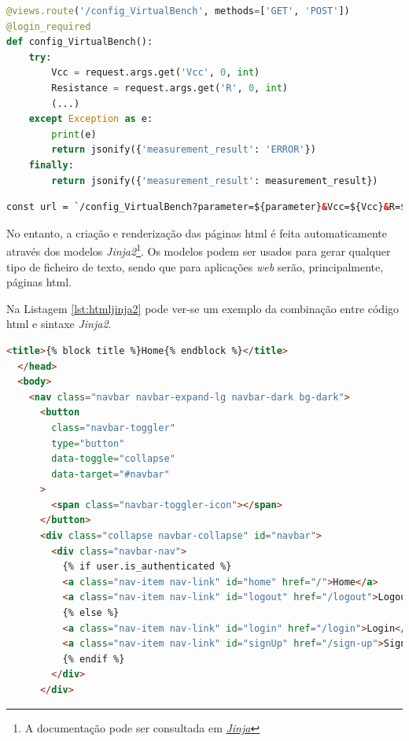 \begin{minipage}{0.9\linewidth}
	\begin{lstlisting}[language=Python, caption=Exemplo atributo \textit{\textbf{args} - \textit{views.py}}, label=lst:argrequest]
@views.route('/config_VirtualBench', methods=['GET', 'POST'])
@login_required
def config_VirtualBench():
    try:
        Vcc = request.args.get('Vcc', 0, int)
        Resistance = request.args.get('R', 0, int)
        (...)
    except Exception as e:
        print(e)
        return jsonify({'measurement_result': 'ERROR'})
    finally:
        return jsonify({'measurement_result': measurement_result})
\end{lstlisting}
\end{minipage}

\begin{minipage}{0.9\linewidth}
	\begin{lstlisting}[language=Html, caption=Exemplo argumentos passados ao servidor - ohm.html, label=lst:paramurl]
const url = `/config_VirtualBench?parameter=${parameter}&Vcc=${Vcc}&R=${Resistance}`;
\end{lstlisting}
\end{minipage}

No entanto, a criação e renderização das páginas \acrshort{html} é feita automaticamente através dos modelos \textit{Jinja2}\footnote{A documentação pode ser consultada em \href{https://jinja.palletsprojects.com/en/3.1.x/templates/}{\textit{Jinja}}}. Os modelos podem ser usados para gerar qualquer tipo de ficheiro de texto, sendo que para aplicações \textit{web} serão, principalmente, páginas \acrshort{html}.

Na Listagem \ref{lst:htmljinja2} pode ver-se um exemplo da combinação entre código \acrshort{html} e sintaxe \textit{Jinja2}.

\begin{minipage}{0.9\linewidth}
	\begin{lstlisting}[language=Html, caption=Exemplo sintaxe \textit{Jinja2} - base.html, label=lst:htmljinja2]
<title>{% block title %}Home{% endblock %}</title>
  </head>
  <body>
    <nav class="navbar navbar-expand-lg navbar-dark bg-dark">
      <button
        class="navbar-toggler"
        type="button"
        data-toggle="collapse"
        data-target="#navbar"
      >
        <span class="navbar-toggler-icon"></span>
      </button>
      <div class="collapse navbar-collapse" id="navbar">
        <div class="navbar-nav">
          {% if user.is_authenticated %}
          <a class="nav-item nav-link" id="home" href="/">Home</a>
          <a class="nav-item nav-link" id="logout" href="/logout">Logout</a>
          {% else %}
          <a class="nav-item nav-link" id="login" href="/login">Login</a>
          <a class="nav-item nav-link" id="signUp" href="/sign-up">Sign Up</a>
          {% endif %}
        </div>
      </div>\end{lstlisting}
\end{minipage}

